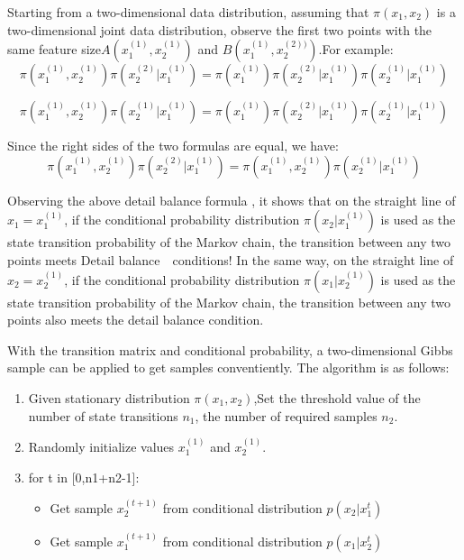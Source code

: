 Starting from a two-dimensional data distribution, assuming that $\pi(x_1,x_2)$ is a two-dimensional joint data distribution, observe the first two points with the same feature size$A(x_1^{(1)},x_2^{(1)})$ and $B(x_1^{(1)},x_2^{(2))})$.For example:
\[
  \pi(x_1^{(1)},x_2^{(1)})\pi(x_2^{(2)}|x_1^{(1)}) = \pi(x_1^{(1)})\pi(x_2^{(2)}|x_1^{(1)})\pi(x_2^{(1)}|x_1^{(1)})
\]

\[
  \pi(x_1^{(1)},x_2^{(1)})\pi(x_2^{(1)}|x_1^{(1)}) = \pi(x_1^{(1)})\pi(x_2^{(2)}|x_1^{(1)})\pi(x_2^{(1)}|x_1^{(1)})
\]

Since the right sides of the two formulas are equal, we have:
\[
  \pi(x_1^{(1)},x_2^{(1)})\pi(x_2^{(2)}|x_1^{(1)}) =   \pi(x_1^{(1)},x_2^{(1)})\pi(x_2^{(1)}|x_1^{(1)})
\]

Observing the above detail balance formula , it shows that on the straight line of $x_1 = x_1^{(1)}$, if the conditional probability distribution $\pi(x_2|x_1^{(1)})$ is used as the state transition probability of the Markov chain, the transition between any two points meets Detail balance　conditions! In the same way, on the straight line of $x_2 = x_2^{(1)}$, if the conditional probability distribution $\pi(x_1|x_2^{(1)})$  is used as the state transition probability of the Markov chain, the transition between any two points also meets the detail balance condition.


With the  transition matrix and conditional probability, a two-dimensional Gibbs sample can be applied to get samples conventiently.
The algorithm is as follows:
\begin{enumerate}
  \item Given stationary distribution $\pi(x_1,x_2)$,Set the threshold value of the number of state transitions $n_1$, the number of required samples $n_2$.
  \item Randomly initialize values $x_1^{(1)}$ and $x_2^{(1)}$.
  \item for t in [0,n1+n2-1]:
      \begin{itemize}
        \item Get sample $x_2^{(t+1)}$ from conditional distribution $p(x_2|x_1^t)$
        \item Get sample $x_1^{(t+1)}$ from conditional distribution $p(x_1|x_2^t)$
      \end{itemize}
\end{enumerate}
